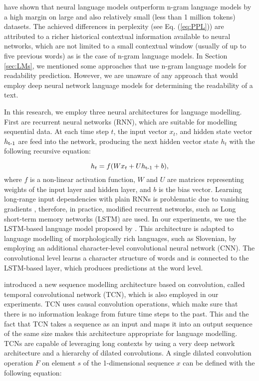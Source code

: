 \documentclass{clv3}
\begin{document}
\citet{mikolov2011empirical} have shown that neural language models outperform n-gram language models by a high margin on large and also relatively small (less than 1 million tokens) datasets. The achieved differences in perplexity (see Eq. (\ref{eq:PPL})) are attributed to a richer historical contextual information available to neural networks, which are not limited to a small contextual window (usually of up to five previous words) as is the case of n-gram language models. In Section \ref{sec:LMs}, we mentioned some approaches that use n-gram language models for readability prediction. However, we are unaware of any approach that would employ deep neural network language models for determining the readability of a text.

In this research, we employ three neural architectures for language modelling. First are recurrent neural networks (RNN), which are suitable for modelling sequential data. At each time step $t$, the input vector $x_t$, and hidden state vector $h\textsubscript{t-1}$ are feed into the network, producing the next hidden vector state $h_t$ with the following recursive equation:

\[
h_t = f(Wx_t + Uh\textsubscript{t-1} + b),
\] 
where $f$ is a non-linear activation function, $W$ and $U$ are matrices representing weights of the input layer and hidden layer,  and $b$ is the bias vector. Learning long-range input dependencies with plain RNNs is problematic due to vanishing gradients \citep{bengio1994learning}, therefore, in practice, modified recurrent networks, such as Long short-term memory networks (LSTM) are used. In our experiments, we use the LSTM-based language model proposed by \citet{kim2016character}. This architecture is adapted to language modelling of morphologically rich languages, such as Slovenian, by employing an additional character-level convolutional neural network (CNN). The convolutional level learns a character structure of words and is connected to the LSTM-based layer, which produces predictions at the word level.

 \citet{bai2018empirical} introduced a new sequence modelling architecture based on convolution, called temporal convolutional network (TCN), which is also employed in our experiments. TCN uses causal convolution operations, which make sure that there is no information leakage from future time steps to the past. This and the fact that TCN takes a sequence as an input and maps it into an output sequence of the same size makes this architecture appropriate for language modelling. TCNs are capable of leveraging long contexts by using a very deep network architecture and a hierarchy of dilated convolutions. A single dilated convolution operation $F$ on element $s$ of the 1-dimensional sequence $x$ can  be defined with the following equation:
\end{document}
